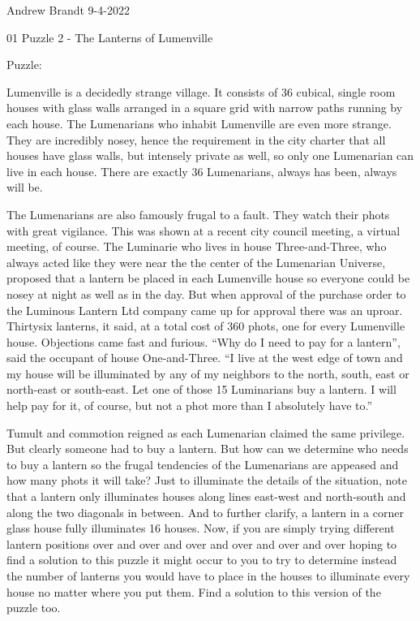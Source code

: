\documentclass[12pt]{article}
\begin{document}
Andrew Brandt
9-4-2022

\Large 01 Puzzle 2 - The Lanterns of Lumenville

\vspace{5mm}

\noindent
\vspace{5mm}
\large Puzzle:

Lumenville is a decidedly strange village. It consists of 36 cubical, single room houses with
glass walls arranged in a square grid with narrow paths running by each house.
The Lumenarians who inhabit Lumenville are even more strange. They are incredibly nosey,
hence the requirement in the city charter that all houses have glass walls, but intensely private as
well, so only one Lumenarian can live in each house. There are exactly 36 Lumenarians, always
has been, always will be.

\vspace{5mm}

The Lumenarians are also famously frugal to a fault. They watch their phots with great
vigilance. This was shown at a recent city council meeting, a virtual meeting, of course. The
Luminarie who lives in house Three-and-Three, who always acted like they were near the the
center of the Lumenarian Universe, proposed that a lantern be placed in each Lumenville house
so everyone could be nosey at night as well as in the day. But when approval of the purchase
order to the Luminous Lantern Ltd company came up for approval there was an uproar. Thirtysix lanterns, it said, at a total cost of 360 phots, one for every Lumenville house.
Objections came fast and furious. “Why do I need to pay for a lantern”, said the occupant of
house One-and-Three. “I live at the west edge of town and my house will be illuminated by any
of my neighbors to the north, south, east or north-east or south-east. Let one of those 15
Luminarians buy a lantern. I will help pay for it, of course, but not a phot more than I absolutely
have to.”

\vspace{5mm}

Tumult and commotion reigned as each Lumenarian claimed the same privilege. But clearly
someone had to buy a lantern. But how can we determine who needs to buy a lantern so the
frugal tendencies of the Lumenarians are appeased and how many phots it will take?
Just to illuminate the details of the situation, note that a lantern only illuminates houses along
lines east-west and north-south and along the two diagonals in between. And to further clarify, a
lantern in a corner glass house fully illuminates 16 houses.
Now, if you are simply trying different lantern positions over and over and over and over and
over and over hoping to find a solution to this puzzle it might occur to you to try to determine
instead the number of lanterns you would have to place in the houses to illuminate every house
no matter where you put them. Find a solution to this version of the puzzle too.
\end{document}
